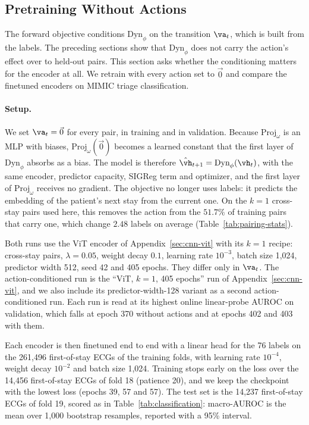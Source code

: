 \subsection{Pretraining Without Actions}
\label{sec:no-actions}

The forward objective conditions $\text{Dyn}_\phi$ on the transition $\va_t$, which is built from the labels. The preceding sections show that $\text{Dyn}_\phi$ does not carry the action's effect over to held-out pairs. This section asks whether the conditioning matters for the encoder at all. We retrain with every action set to $\vec 0$ and compare the finetuned encoders on MIMIC triage classification.

\paragraph{Setup.} We set $\va_t=\vec 0$ for every pair, in training and in validation. Because $\text{Proj}_\omega$ is an MLP with biases, $\text{Proj}_\omega(\vec 0)$ becomes a learned constant that the first layer of $\text{Dyn}_\phi$ absorbs as a bias. The model is therefore $\hat\vh_{t+1}=\text{Dyn}_\phi(\vh_t)$, with the same encoder, predictor capacity, SIGReg term and optimizer, and the first layer of $\text{Proj}_\omega$ receives no gradient. The objective no longer uses labels: it predicts the embedding of the patient's next stay from the current one. On the $k=1$ cross-stay pairs used here, this removes the action from the $51.7\%$ of training pairs that carry one, which change $2.48$ labels on average (Table~\ref{tab:pairing-stats}).

Both runs use the ViT encoder of Appendix~\ref{sec:cnn-vit} with its $k=1$ recipe: cross-stay pairs, $\lambda=0.05$, weight decay $0.1$, learning rate $10^{-3}$, batch size 1{,}024, predictor width 512, seed 42 and 405 epochs. They differ only in $\va_t$. The action-conditioned run is the ``ViT, $k=1$, 405 epochs'' run of Appendix~\ref{sec:cnn-vit}, and we also include its predictor-width-128 variant as a second action-conditioned run. Each run is read at its highest online linear-probe AUROC on validation, which falls at epoch 370 without actions and at epochs 402 and 403 with them.

Each encoder is then finetuned end to end with a linear head for the 76 labels on the 261{,}496 first-of-stay ECGs of the training folds, with learning rate $10^{-4}$, weight decay $10^{-2}$ and batch size 1{,}024. Training stops early on the loss over the 14{,}456 first-of-stay ECGs of fold 18 (patience 20), and we keep the checkpoint with the lowest loss (epochs 39, 57 and 57). The test set is the 14{,}237 first-of-stay ECGs of fold 19, scored as in Table~\ref{tab:classification}: macro-AUROC is the mean over 1{,}000 bootstrap resamples, reported with a 95\% interval.

